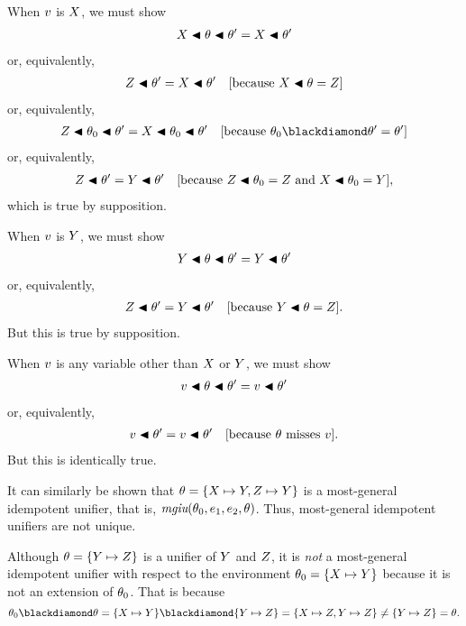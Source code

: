 \documentclass[runningheads]{llncs}
\DeclareMathOperator{\mgiu}{\emph{mgiu}}
\begin{document}
When $v$ is $X$, we must show
\begin{align*}
    X \blacktriangleleft \theta \blacktriangleleft \theta'  = X \blacktriangleleft \theta' 
\end{align*}
or, equivalently, 
\begin{align*}
    Z \blacktriangleleft \theta'  = X \blacktriangleleft \theta' \quad \text{[because $X \blacktriangleleft \theta = Z$]}
\end{align*}
or, equivalently,
\begin{align*}
    \var{Z} \apply \thet{0} \apply \theta'  = \var{X} \apply \thet{0} \apply \theta' \quad \text{[because $\thet{0} \compose \theta' =  \theta'$]}
\end{align*}
or, equivalently,
\begin{align*}
    Z  \blacktriangleleft \theta'  = Y \blacktriangleleft \theta' \quad \text{[because $Z \blacktriangleleft \theta_{0} =  Z$ and 
    $X \blacktriangleleft \theta_{0} = Y$]},
\end{align*}
which is true by supposition.


When $v$ is $Y$, we must show
\begin{align*}
    Y \blacktriangleleft \theta \blacktriangleleft \theta'  = Y \blacktriangleleft \theta' 
\end{align*}
or, equivalently, 
\begin{align*}
    Z \blacktriangleleft \theta'  = Y \blacktriangleleft \theta' \quad \text{[because $Y \blacktriangleleft \theta = Z$]}.
 \end{align*}   
 But this is true by supposition.

 When $v$ is any variable other than $X$ or $Y$, we must show
 \begin{align*}
    v \blacktriangleleft \theta \blacktriangleleft \theta'  = v \blacktriangleleft \theta' 
\end{align*}
 or, equivalently,
  \begin{align*}
    v \blacktriangleleft \theta'  = v \blacktriangleleft \theta' \quad \text{[because $\theta$ misses $v$]}.
\end{align*}
But this is identically true.

It can similarly be shown that $\theta = \{X \mapsto Y, Z \mapsto Y\}$ is a most-general idempotent unifier, that is,  $\mgiu(\thet{0}, \e{1}, \e{2}, \theta)$.  Thus, most-general idempotent unifiers are not unique.

Although $\theta = \{Y  \mapsto Z \}$ is a unifier of $Y$ and $Z$, it is \emph{not} a most-general idempotent unifier with respect to the environment $\theta_{0} = \{X \mapsto Y\}$ because it is not an extension of $\theta_{0}$.  That is because
\[\thet{0} \compose \theta = \{\var{X} \mapsto \var{Y}\} \compose \{\var{Y}  \mapsto \var{Z} \} = \{\var{X} \mapsto \var{Z}, \var{Y}  \mapsto \var{Z}\} \neq \{\var{Y}  \mapsto \var{Z} \} = \theta. \]
\end{document}
